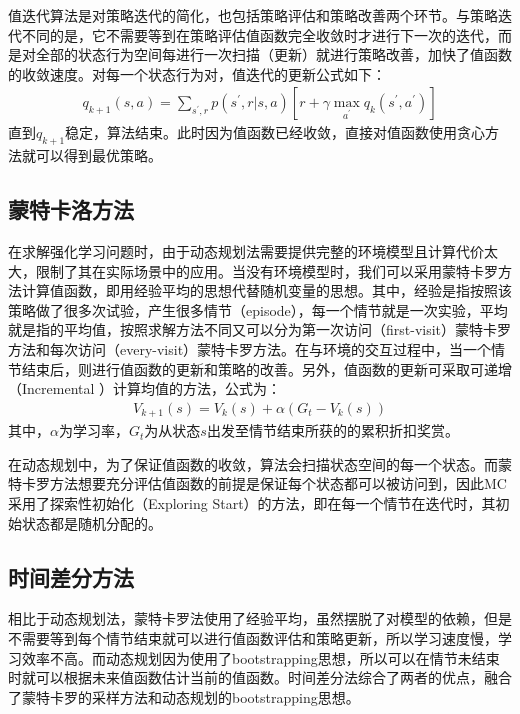 值迭代算法是对策略迭代的简化，也包括策略评估和策略改善两个环节。与策略迭代不同的是，它不需要等到在策略评估值函数完全收敛时才进行下一次的迭代，而是对全部的状态行为空间每进行一次扫描（更新）就进行策略改善，加快了值函数的收敛速度。对每一个状态行为对，值迭代的更新公式如下：
\begin{equation}
\begin{aligned}
q_{k+1}(s,a)=\sum_{s^{'},r}p(s^{'},r|s,a)[r+\gamma \max_{a^{'}} q_{k}(s^{'},a^{'})]
\end{aligned}
\end{equation}
直到$q_{k+1}$稳定，算法结束。此时因为值函数已经收敛，直接对值函数使用贪心方法就可以得到最优策略。

\subsection{蒙特卡洛方法}
在求解强化学习问题时，由于动态规划法需要提供完整的环境模型且计算代价太大，限制了其在实际场景中的应用。当没有环境模型时，我们可以采用蒙特卡罗方法计算值函数，即用经验平均的思想代替随机变量的思想。其中，经验是指按照该策略做了很多次试验，产生很多情节（episode），每一个情节就是一次实验，平均就是指的平均值，按照求解方法不同又可以分为第一次访问（first-visit）蒙特卡罗方法和每次访问（every-visit）蒙特卡罗方法。在与环境的交互过程中，当一个情节结束后，则进行值函数的更新和策略的改善。另外，值函数的更新可采取可递增（Incremental ）计算均值的方法，公式为：
\begin{equation}
\begin{aligned}
V_{k+1}(s)=V_{k}(s)+ \alpha(G_{t}-V_{k}(s))
\end{aligned}
\end{equation}
其中，$\alpha$为学习率，$G_{t}$为从状态$s$出发至情节结束所获的的累积折扣奖赏。

在动态规划中，为了保证值函数的收敛，算法会扫描状态空间的每一个状态。而蒙特卡罗方法想要充分评估值函数的前提是保证每个状态都可以被访问到，因此MC采用了探索性初始化（Exploring Start）的方法，即在每一个情节在迭代时，其初始状态都是随机分配的。

\subsection{时间差分方法}
相比于动态规划法，蒙特卡罗法使用了经验平均，虽然摆脱了对模型的依赖，但是不需要等到每个情节结束就可以进行值函数评估和策略更新，所以学习速度慢，学习效率不高。而动态规划因为使用了bootstrapping思想，所以可以在情节未结束时就可以根据未来值函数估计当前的值函数。时间差分法综合了两者的优点，融合了蒙特卡罗的采样方法和动态规划的bootstrapping思想。

